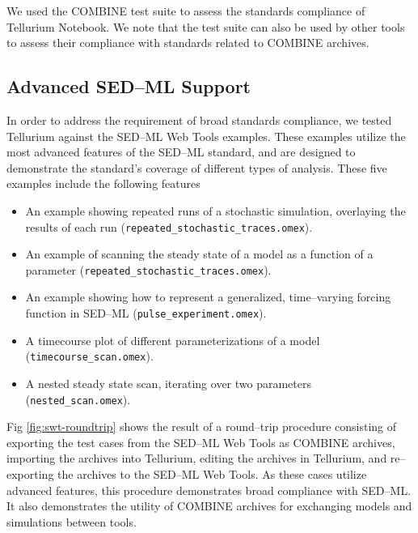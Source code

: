 \documentclass[10pt,letterpaper]{article}
\begin{document}
We used the COMBINE test suite to assess the standards compliance of Tellurium Notebook. We note that the test suite can also be used by other tools to assess their compliance with standards related to COMBINE archives.

\subsection*{Advanced SED--ML Support}

In order to address the requirement of broad standards compliance, we tested Tellurium against the SED--ML Web Tools examples. These examples utilize the most advanced features of the SED--ML standard, and are designed to demonstrate the standard's coverage of different types of analysis. These five examples include the following features

\begin{itemize}
\item An example showing repeated runs of a stochastic simulation, overlaying the results of each run (\texttt{repeated\_stochastic\_traces.omex}).
\item An example of scanning the steady state of a model as a function of a parameter (\texttt{repeated\_stochastic\_traces.omex}).
\item An example showing how to represent a generalized, time--varying forcing function in SED--ML (\texttt{pulse\_experiment.omex}).
\item A timecourse plot of different parameterizations of a model (\texttt{timecourse\_scan.omex}).
\item A nested steady state scan, iterating over two parameters (\texttt{nested\_scan.omex}).
\end{itemize}

Fig \ref{fig:swt-roundtrip} shows the result of a round--trip procedure consisting of exporting the test cases from the SED--ML Web Tools as COMBINE archives, importing the archives into Tellurium, editing the archives in Tellurium, and re--exporting the archives to the SED--ML Web Tools. As these cases utilize advanced features, this procedure demonstrates broad compliance with SED--ML. It also demonstrates the utility of COMBINE archives for exchanging models and simulations between tools.
\end{document}
